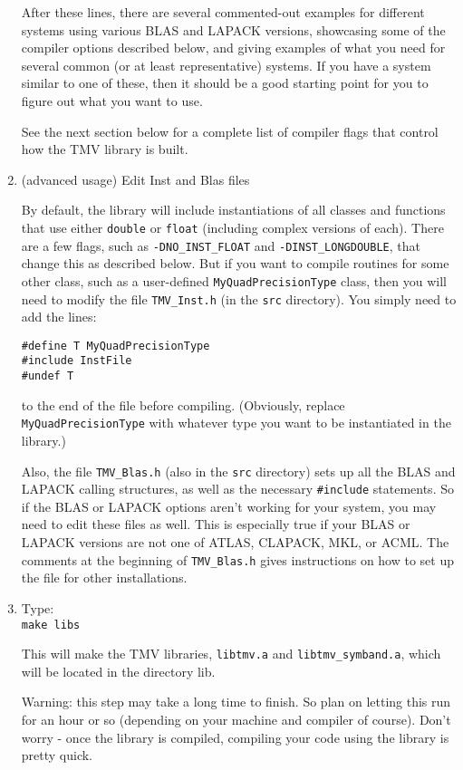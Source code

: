 \documentclass[twoside,letterpaper,11pt]{article}
\renewcommand{\tt}[1]{{\texttt {#1}}}
\begin{document}
\begin{enumerate}
After these lines, there are several commented-out examples for different systems 
using various BLAS
and LAPACK versions, showcasing some of the compiler options described below,
and giving examples of what you need for several common (or at least representative) systems.
If you have a system similar to one of these, then it should be a good 
starting point for you to figure out what you want to use.

See the next section below for a complete list of compiler flags that control how the TMV library is built.

\item{(advanced usage) Edit Inst and Blas files}

By default, the library will include instantiations of all classes and 
functions
that use either \tt{double} or \tt{float} (including complex versions of each).  
There are a few flags, such as 
\tt{-DNO\_INST\_FLOAT} and \tt{-DINST\_LONGDOUBLE},
that change this as described below.  
But if you want to compile routines for some other class, such as a user-defined
\tt{MyQuadPrecisionType} class, then you will need to modify the file \tt{TMV\_Inst.h} 
(in the \tt{src} directory).
You simply need to add the lines:
\begin{verbatim}
#define T MyQuadPrecisionType
#include InstFile
#undef T
\end{verbatim}
to the end of the file before compiling.  (Obviously, replace \tt{MyQuadPrecisionType} with whatever
type you want to be instantiated in the library.)

Also, the file \tt{TMV\_Blas.h} (also in the \tt{src} directory)
sets up all the BLAS and LAPACK calling structures,
as well as the necessary \tt{\#include} statements.  
So if the BLAS or LAPACK options aren't working 
for your system, you may need to edit these files as well.
This is especially true if your BLAS or LAPACK versions are not one of 
ATLAS, CLAPACK, MKL, or ACML.  The comments at the beginning of 
\tt{TMV\_Blas.h} gives instructions on how to set up the file for 
other installations.

\item
Type: \\
\tt{make libs}

This will make the TMV libraries, \tt{libtmv.a} and \tt{libtmv\_symband.a},
which will be located in the directory lib.

Warning: this step may take a long time to finish.  So plan on letting this run
for an hour or so (depending on your machine and compiler of course).
Don't worry - once the library is compiled, compiling your code using the 
library is pretty quick.


\end{enumerate}
\end{document}
